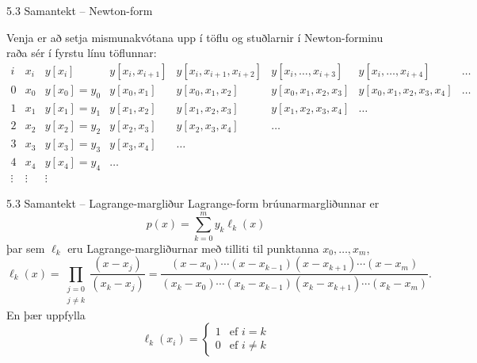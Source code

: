 \begin{frame}{5.3 Samantekt -- Newton-form} 

Venja er að setja mismunakvótana upp í töflu og stuðlarnir
í Newton-forminu raða sér í fyrstu línu töflunnar:
{\footnotesize
\begin{equation*}
  \begin{array}{c|c|cccccc}
    i & x_i & y[x_i] & y[x_i,x_{i+1}] & y[x_i,x_{i+1},x_{i+2}]
    & y[x_i,\dots,x_{i+3}] &y[x_i,\dots,x_{i+4}] &\dots  \\
    \hline
    0 & x_0 & y[x_0] = y_0 & y[x_0,x_1] & y[x_0,x_1,x_2]
    & y[x_0,x_1,x_2,x_3]&y[x_0,x_1,x_2,x_3,x_4]& \dots \\
    1 & x_1 & y[x_1] = y_1 & y[x_1,x_2] & y[x_1,x_2,x_3] &
    y[x_1,x_2,x_3,x_4]&\dots \\
    2 & x_2 & y[x_2] = y_2 & y[x_2,x_3] &y[x_2,x_3,x_4]&\dots & \\
    3 & x_3 & y[x_3] = y_3 & y[x_3,x_4] &\dots & & \\
    4 & x_4 & y[x_4] = y_4 & \dots &  \\
\vdots & \vdots &\vdots
  \end{array}
\end{equation*}
}
\end{frame}

\begin{frame}{5.3 Samantekt -- Lagrange-margliður} 
Lagrange-form brúunarmargliðunnar er
$$
p(x)=\sum_{k=0}^m y_k\ell_{k}(x)
$$
þar sem $\ell_{k}$ eru Lagrange-margliðurnar með tilliti til
punktanna $x_0,\dots,x_m$,
{\small
\begin{equation*}
	\ell_{k}(x) = \prod_
	{\substack{j=0\\ j\neq k}}\dfrac{(x-x_j)}{(x_k-x_j)}
	= \dfrac{(x-x_0)\cdots(x-x_{k-1})
		(x-x_{k+1})\cdots(x-x_m)}
	{(x_k-x_0)\cdots(x_k-x_{k-1})
		(x_k-x_{k+1})\cdots(x_k-x_m)}.
\end{equation*}
}
\pause
En þær uppfylla
\begin{equation*}
  \ell_{k}(x_i) = \left\{ \begin{array}{cc}
      1 & \text{ef } i = k \\
      0 & \text{ef } i \not= k
  \end{array} \right.
\end{equation*}

\end{frame}

